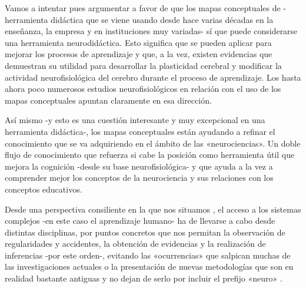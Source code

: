 \documentclass[spanish]{textolivre}
\begin{document}
Vamos a intentar pues argumentar a favor de que los mapas conceptuales de \textcite{novak1990concept}%
-herramienta didáctica que se viene usando desde hace varias décadas en la enseñanza, la empresa y en instituciones muy variadas- sí que puede considerarse una herramienta neurodidáctica. Esto significa que se pueden aplicar para mejorar los procesos de aprendizaje y que, a la vez, existen evidencias que demuestran su utilidad para desarrollar la plasticidad cerebral y modificar la actividad neurofisiológica del cerebro durante el proceso de aprendizaje. Los hasta ahora poco numerosos estudios neurofisiológicos en relación con el uso de los mapas conceptuales apuntan claramente en esa dirección.

Así mismo -y esto es una cuestión interesante y muy excepcional en una herramienta didáctica-, los mapas conceptuales están ayudando a refinar el conocimiento que se va adquiriendo en el ámbito de las «neurociencias». Un doble flujo de conocimiento que refuerza si cabe la posición como herramienta útil que mejora la cognición -desde su base neurofisiológica- y que ayuda a la vez a comprender mejor los conceptos de la neurociencia y sus relaciones con los conceptos educativos.

Desde una perspectiva consiliente en la que nos situamos \cite{puerta2020,wilson1999unity},
el acceso a los sistemas complejos -en este caso el aprendizaje humano- ha de llevarse a cabo desde distintas disciplinas, por puntos concretos que nos permitan la observación de regularidades y accidentes, la obtención de evidencias y la realización de inferencias -por este orden-, evitando las «ocurrencias» que salpican muchas de las investigaciones actuales o la presentación de nuevas metodologías que son en realidad bastante antiguas y no dejan de serlo por incluir el prefijo «neuro» \cite{simon2019ambientes}.%
\end{document}
